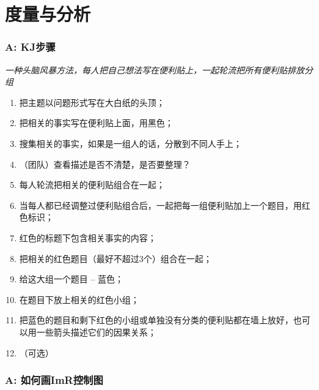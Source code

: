 
\chapter{度量与分析}

\hypertarget{a-kjux6b65ux9aa4}{%
\subsection{A: KJ步骤}\label{a-kjux6b65ux9aa4}}

\emph{一种头脑风暴方法，每人把自己想法写在便利贴上，一起轮流把所有便利贴排放分组}

\begin{enumerate}
\tightlist
\item
  把主题以问题形式写在大白纸的头顶；
\item
  把相关的事实写在便利贴上面，用黑色；
\item
  搜集相关的事实，如果是一组人的话，分散到不同人手上；
\item
  （团队）查看描述是否不清楚，是否要整理？
\item
  每人轮流把相关的便利贴组合在一起；
\item
  当每人都已经调整过便利贴组合后，一起把每一组便利贴加上一个题目，用红色标识；
\item
  红色的标题下包含相关事实的内容；
\item
  把相关的红色题目（最好不超过3个）组合在一起；
\item
  给这大组一个题目 -- 蓝色；
\item
  在题目下放上相关的红色小组；
\item
  把蓝色的题目和剩下红色的小组或单独没有分类的便利贴都在墙上放好，也可以用一些箭头描述它们的因果关系；
\item
  （可选）
\end{enumerate}

\begin{description}
\item[]
\end{description}

\hypertarget{a-ux5982ux4f55ux753bimrux63a7ux5236ux56fe}{%
\subsection{A:
如何画ImR控制图}\label{a-ux5982ux4f55ux753bimrux63a7ux5236ux56fe}}


